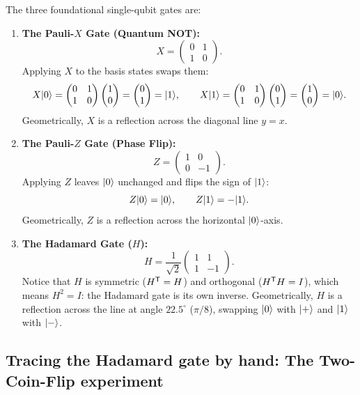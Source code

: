 The three foundational single-qubit gates are:

\begin{enumerate}
  \item \textbf{The Pauli-$X$ Gate (Quantum NOT):}
  \[
    X = \begin{pmatrix} 0 & 1 \\ 1 & 0 \end{pmatrix}.
  \]
  Applying $X$ to the basis states swaps them:
  \[
    X\lvert 0 \rangle = \begin{pmatrix} 0 & 1 \\ 1 & 0 \end{pmatrix}\begin{pmatrix}1 \\ 0\end{pmatrix} = \begin{pmatrix}0 \\ 1\end{pmatrix} = \lvert 1 \rangle,
    \qquad
    X\lvert 1 \rangle = \begin{pmatrix} 0 & 1 \\ 1 & 0 \end{pmatrix}\begin{pmatrix}0 \\ 1\end{pmatrix} = \begin{pmatrix}1 \\ 0\end{pmatrix} = \lvert 0 \rangle.
  \]
  Geometrically, $X$ is a reflection across the diagonal line $y = x$.

  \item \textbf{The Pauli-$Z$ Gate (Phase Flip):}
  \[
    Z = \begin{pmatrix} 1 & 0 \\ 0 & -1 \end{pmatrix}.
  \]
  Applying $Z$ leaves $\lvert 0 \rangle$ unchanged and flips the sign of $\lvert 1 \rangle$:
  \[
    Z\lvert 0 \rangle = \lvert 0 \rangle, \qquad Z\lvert 1 \rangle = -\lvert 1 \rangle.
  \]
  Geometrically, $Z$ is a reflection across the horizontal $\lvert 0 \rangle$-axis.

  \item \textbf{The Hadamard Gate ($H$):}
  \[
    H = \frac{1}{\sqrt{2}}\begin{pmatrix} 1 & 1 \\ 1 & -1 \end{pmatrix}.
  \]
  Notice that $H$ is symmetric ($H^{\mathsf{T}} = H$) and orthogonal ($H^{\mathsf{T}} H = I$), which means
  $H^2 = I$: the Hadamard gate is its own inverse. Geometrically, $H$ is a reflection
  across the line at angle $22.5^\circ$ ($\pi/8$), swapping $\lvert 0 \rangle$ with $\lvert + \rangle$
  and $\lvert 1 \rangle$ with $\lvert - \rangle$.
\end{enumerate}

\subsection{Tracing the Hadamard gate by hand: The Two-Coin-Flip experiment}

